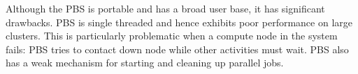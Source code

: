 Although the PBS is portable and has a broad user base, it has significant drawbacks.
PBS is single threaded and hence exhibits poor performance on large clusters.
This is particularly problematic when a compute node in the system fails:
PBS tries to contact down node while other activities must wait.
PBS also has a weak mechanism for starting and cleaning up parallel jobs.
